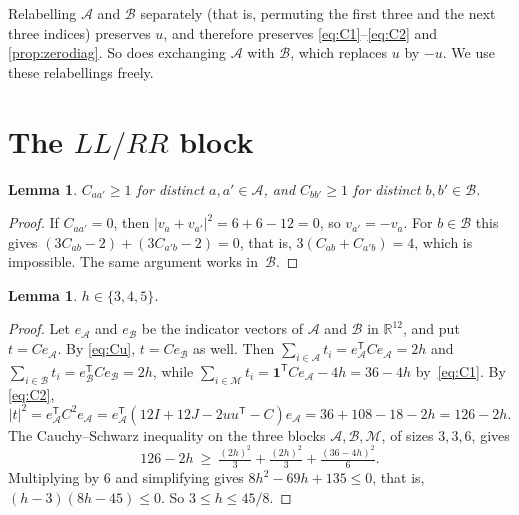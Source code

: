 \documentclass[11pt,a4paper]{amsart}
\newtheorem{lemma}[theorem]{Lemma}
\theoremstyle{definition}
\theoremstyle{remark}
\newcommand{\R}{\mathbb{R}}
\newcommand{\one}{\mathbf{1}}
\newcommand{\cA}{\mathcal{A}}
\newcommand{\cB}{\mathcal{B}}
\newcommand{\cM}{\mathcal{M}}
\newcommand{\T}{\mathsf{T}}
\begin{document}
Relabelling $\cA$ and $\cB$ separately (that is, permuting the first three and the next three indices)
preserves $u$, and therefore preserves \eqref{eq:C1}--\eqref{eq:C2} and \cref{prop:zerodiag}. So does
exchanging $\cA$ with $\cB$, which replaces $u$ by $-u$. We use these relabellings freely.

\section{The \texorpdfstring{$LL/RR$}{LL/RR} block}\label{sec:block}

\begin{lemma}\label{lem:nozero}
$C_{aa'}\ge1$ for distinct $a,a'\in\cA$, and $C_{bb'}\ge1$ for distinct $b,b'\in\cB$.
\end{lemma}

\begin{proof}
If $C_{aa'}=0$, then $|v_a+v_{a'}|^2=6+6-12=0$, so $v_{a'}=-v_a$. For $b\in\cB$ this gives
$(3C_{ab}-2)+(3C_{a'b}-2)=0$, that is, $3(C_{ab}+C_{a'b})=4$, which is impossible. The same argument works
in~$\cB$.
\end{proof}

\begin{lemma}\label{lem:h}
$h\in\{3,4,5\}$.
\end{lemma}

\begin{proof}
Let $e_\cA$ and $e_\cB$ be the indicator vectors of $\cA$ and $\cB$ in $\R^{12}$, and put $t=Ce_\cA$. By
\eqref{eq:Cu}, $t=Ce_\cB$ as well. Then $\sum_{i\in\cA}t_i=e_\cA^{\T}Ce_\cA=2h$ and
$\sum_{i\in\cB}t_i=e_\cB^{\T}Ce_\cB=2h$, while $\sum_{i\in\cM}t_i=\one^{\T}Ce_\cA-4h=36-4h$ by~\eqref{eq:C1}. By
\eqref{eq:C2},
\[
|t|^2=e_\cA^{\T}C^2e_\cA=e_\cA^{\T}(12I+12J-2uu^{\T}-C)e_\cA=36+108-18-2h=126-2h .
\]
The Cauchy--Schwarz inequality on the three blocks $\cA,\cB,\cM$, of sizes $3,3,6$, gives
\[
126-2h\ \ge\ \tfrac{(2h)^2}{3}+\tfrac{(2h)^2}{3}+\tfrac{(36-4h)^2}{6}.
\]
Multiplying by $6$ and simplifying gives $8h^2-69h+135\le0$, that is, $(h-3)(8h-45)\le0$. So
$3\le h\le45/8$.
\end{proof}
\end{document}
